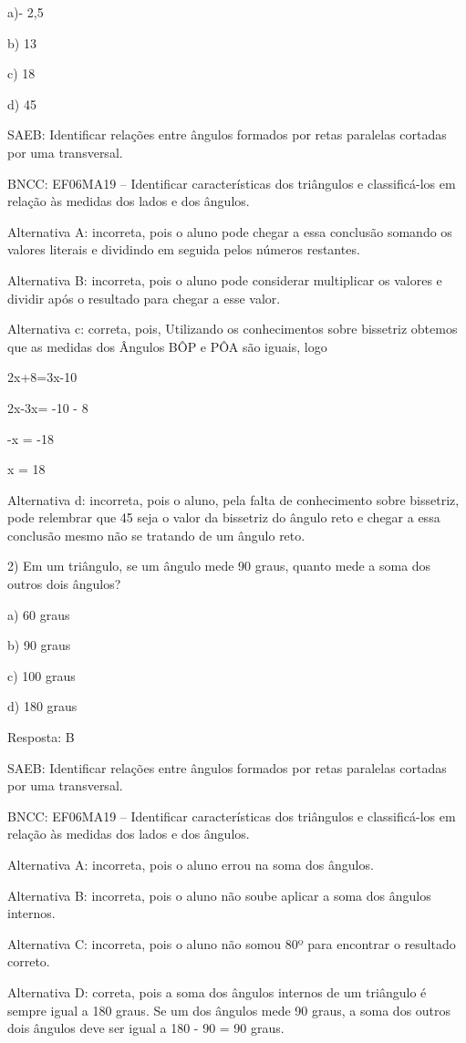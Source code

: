 a)- 2,5

b) 13

c) 18

d) 45

SAEB: Identificar relações entre ângulos formados por retas paralelas
cortadas por uma transversal.

BNCC: EF06MA19 -- Identificar características dos triângulos e
classificá-los em relação às medidas dos lados e dos ângulos.

Alternativa A: incorreta, pois o aluno pode chegar a essa conclusão
somando os valores literais e dividindo em seguida pelos números
restantes.

Alternativa B: incorreta, pois o aluno pode considerar multiplicar os
valores e dividir após o resultado para chegar a esse valor.

Alternativa c: correta, pois, Utilizando os conhecimentos sobre
bissetriz obtemos que as medidas dos Ângulos BÔP e PÔA são iguais, logo

2x+8=3x-10

2x-3x= -10 - 8

-x = -18

x = 18

Alternativa d: incorreta, pois o aluno, pela falta de conhecimento sobre
bissetriz, pode relembrar que 45 seja o valor da bissetriz do ângulo
reto e chegar a essa conclusão mesmo não se tratando de um ângulo reto.

2) Em um triângulo, se um ângulo mede 90 graus, quanto mede a soma dos
outros dois ângulos?

a) 60 graus

b) 90 graus

c) 100 graus

d) 180 graus

Resposta: B

SAEB: Identificar relações entre ângulos formados por retas paralelas
cortadas por uma transversal.

BNCC: EF06MA19 -- Identificar características dos triângulos e
classificá-los em relação às medidas dos lados e dos ângulos.

Alternativa A: incorreta, pois o aluno errou na soma dos ângulos.

Alternativa B: incorreta, pois o aluno não soube aplicar a soma dos
ângulos internos.

Alternativa C: incorreta, pois o aluno não somou 80º para encontrar o
resultado correto.

Alternativa D: correta, pois a soma dos ângulos internos de um triângulo
é sempre igual a 180 graus. Se um dos ângulos mede 90 graus, a soma dos
outros dois ângulos deve ser igual a 180 - 90 = 90 graus.

